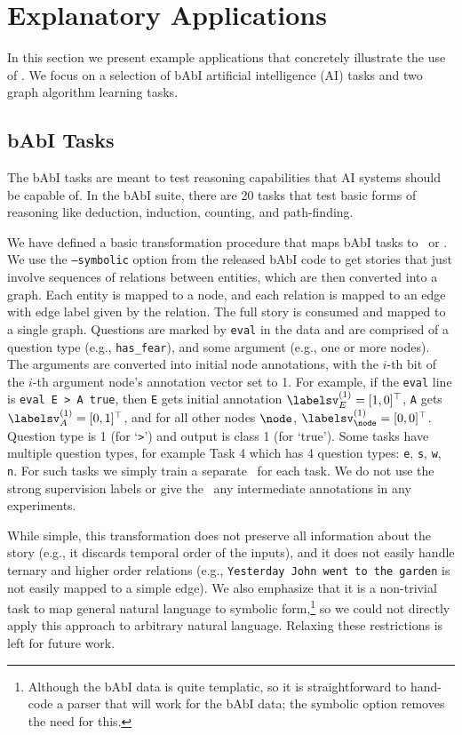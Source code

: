 \section{Explanatory Applications}

In this section we present example applications that concretely illustrate the use of \OurMethodShorts.
We focus on a selection of bAbI artificial intelligence (AI) tasks \citep{weston2015towards} and two graph algorithm learning tasks.

\subsection{bAbI Tasks}
The bAbI tasks are meant to test reasoning capabilities that AI systems should be capable of.
In the bAbI suite, there are 20 tasks that test basic forms of reasoning like deduction, induction, counting,
and path-finding.

We have defined a basic transformation procedure that maps bAbI tasks
to \OurMethodMinorShorts~or \OurMethodShorts. We use the \texttt{--symbolic} option from the
released bAbI code to get stories that just involve sequences
of relations between entities, which are then converted into a graph. Each entity is mapped to a
node, and each relation is mapped to an edge with edge label given by the
relation. The full story is consumed and mapped to a single
graph.  Questions are marked by \texttt{eval} in the data and are comprised
of a question type (e.g., \texttt{has\_fear}), and some
argument (e.g., one or more nodes). The arguments are converted into
initial node annotations, with the $i$-th bit of the $i$-th argument node's
annotation vector set to 1.
For example, if the \texttt{eval} line is \texttt{eval E > A true}, then \texttt{E} gets
initial annotation $\labelsv_E^{(1)}=[1,0]^\top$, \texttt{A} gets
$\labelsv_A^{(1)}=[0,1]^\top$, and for all other nodes $\node$,
$\labelsv_\node^{(1)}=[0,0]^\top$. Question type is 1 (for
`\texttt{>}') and output is class 1 (for `true').
Some tasks have multiple question types, for example Task 4 which has 4
question types: \texttt{e}, \texttt{s}, \texttt{w}, \texttt{n}. For such tasks
we simply train a separate \OurMethodMinorShort~for each task.
We do not use the strong supervision labels or give the \OurMethodShorts~any
intermediate annotations in any experiments.

While simple, this transformation does not preserve all
information about the story (e.g., it discards temporal order of the
inputs), and it does not easily handle ternary and higher order
relations (e.g., \texttt{Yesterday John went to the garden} is not
easily mapped to a simple edge).
We also emphasize that it is a non-trivial task to map general natural language to symbolic form,\footnote{Although the bAbI data is quite templatic, so it is straightforward to hand-code a parser that will work for the bAbI data; the symbolic option removes the need for this.}
so we could not directly apply this approach to arbitrary natural language.
Relaxing these restrictions is left for future work.

